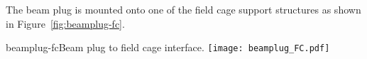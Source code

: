 The beam plug is mounted onto one of the field cage support structures as shown in Figure~\ref{fig:beamplug-fc}. %
\begin{cdrfigure}{beamplug-fc}{Beam plug to field cage interface.}
\texttt{[image: beamplug\_FC.pdf]}
\end{cdrfigure}



